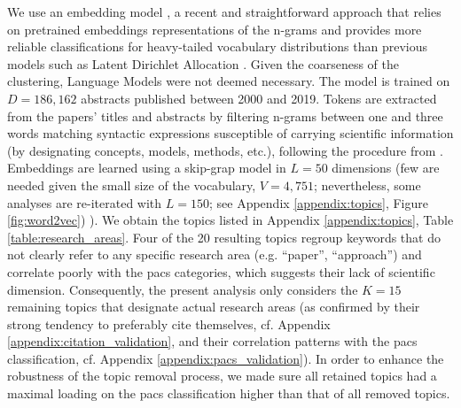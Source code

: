 \documentclass{article}
\begin{document}
We use an embedding model \citealt{Dieng2020}, a recent and straightforward approach that relies on pretrained embeddings representations of the n-grams and provides more reliable classifications for heavy-tailed vocabulary distributions than previous models such as Latent Dirichlet Allocation \citep{Blei2003}. Given the coarseness of the clustering, Language Models were not deemed necessary.
The model is trained on $D=186,162$ abstracts published between 2000 and 2019. Tokens are extracted from the papers' titles and abstracts by filtering n-grams between one and three words matching syntactic expressions susceptible of carrying scientific information (by designating concepts, models, methods, etc.), following the procedure from \citealt{Gautheron2023,omodei_tel-01097702}. Embeddings are learned using a skip-grap model in $L=50$ dimensions (few are needed given the small size of the vocabulary, $V=4,751$; nevertheless, some analyses are re-iterated with $L=150$; see Appendix \ref{appendix:topics}, Figure \ref{fig:word2vec}) \citep{word2vec}). We obtain the topics listed in Appendix \ref{appendix:topics}, Table \ref{table:research_areas}. Four of the 20 resulting topics regroup keywords that do not clearly refer to any specific research area (e.g. ``paper'', ``approach'') and correlate poorly with the \gls{pacs} categories, which suggests their lack of scientific dimension. Consequently, the present analysis only considers the $K=15$ remaining topics that designate actual research areas (as confirmed by their strong tendency to preferably cite themselves, cf. Appendix \ref{appendix:citation_validation}, and their correlation patterns with the \gls{pacs} classification, cf. Appendix \ref{appendix:pacs_validation}). In order to enhance the robustness of the topic removal process, we made sure all retained topics had a maximal loading on the \gls{pacs} classification higher than that of all removed topics.
\end{document}
